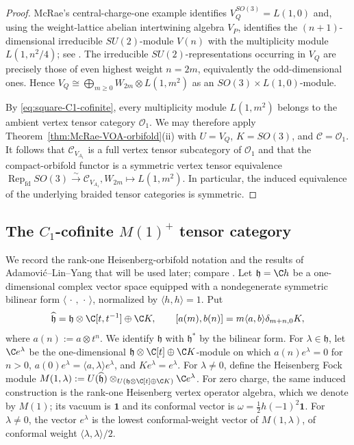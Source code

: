 \documentclass[12pt,leqno]{amsart}
\numberwithin{equation}{section} \newtheorem{thm}{Theorem}[section] \newtheorem{lem}[thm]{Lemma} \newtheorem{ex}[thm]{Example} \newtheorem{prop}[thm]{Proposition} \newtheorem{cor}[thm]{Corollary} \newtheorem{defi}[thm]{Definition} \newtheorem{rmk}[thm]{Remark} \newtheorem{notation}[thm]{Notation}
\newcommand{\one}{\mathbf{1}}
\newcommand{\Rep}{\operatorname{Rep}}
\newcommand{\Ovir}{\mathcal O_1}
\begin{document}
\begin{proof}
McRae's central-charge-one example identifies \(V_Q^{SO(3)}=L(1,0)\) and, using the weight-lattice abelian intertwining algebra \(V_P\), identifies the \((n+1)\)-dimensional irreducible \(SU(2)\)-module \(V(n)\) with the multiplicity module \(L(1,n^2/4)\); see \cite[Example~4.11]{McRae}. The irreducible \(SU(2)\)-representations occurring in \(V_Q\) are precisely those of even highest weight \(n=2m\), equivalently the odd-dimensional ones. Hence \(V_Q\cong\bigoplus_{m\ge0}W_{2m}\otimes L(1,m^2)\) as an \(SO(3)\times L(1,0)\)-module.

By \eqref{eq:square-C1-cofinite}, every multiplicity module \(L(1,m^2)\) belongs to the ambient vertex tensor category \(\Ovir\). We may therefore apply Theorem~\ref{thm:McRae-VOA-orbifold}(ii) with \(U=V_Q\), \(K=SO(3)\), and \(\mathcal C=\Ovir\). It follows that \(\mathcal C_{V_{A_1}}\) is a full vertex tensor subcategory of \(\Ovir\) and that the compact-orbifold functor is a symmetric vertex tensor equivalence \(\Rep_{\mathrm{fd}}SO(3) \overset{\sim}{\longrightarrow} \mathcal C_{V_{A_1}}, W_{2m}\longmapsto L(1,m^2)\). In particular, the induced equivalence of the underlying braided tensor categories is symmetric.
\end{proof}

\subsection{The \texorpdfstring{$C_1$}{C1}-cofinite \texorpdfstring{$M(1)^+$}{M(1)+} tensor category}
\label{subsec:ALY-package}

We record the rank-one Heisenberg-orbifold notation and the results of Adamovi\'c--Lin--Yang that will be used later; compare \cite[Section~2.1]{ALY}. Let $\mathfrak h=\C h$ be a one-dimensional complex vector space equipped with a nondegenerate symmetric bilinear form $\langle\,\cdot\,,\,\cdot\,\rangle$, normalized by $\langle h,h\rangle=1$. Put
\[
\widehat{\mathfrak h}
=
\mathfrak h\otimes\C[t,t^{-1}]\oplus\C K,
\qquad
[a(m),b(n)]
=
m\langle a,b\rangle\delta_{m+n,0}K,
\]
where $a(n):=a\otimes t^n$. We identify $\mathfrak h$ with $\mathfrak h^*$ by the bilinear form. For $\lambda\in\mathfrak h$, let $\C e^\lambda$ be the one-dimensional $\mathfrak h\otimes\C[t]\oplus\C K$-module on which \(a(n)e^\lambda=0\) for \(n>0\), \(a(0)e^\lambda=\langle a,\lambda\rangle e^\lambda\), and \(Ke^\lambda=e^\lambda\). For $\lambda\ne0$, define the Heisenberg Fock module \(M(1,\lambda):= U(\widehat{\mathfrak h}) \otimes_{U(\mathfrak h\otimes\C[t]\oplus\C K)} \C e^\lambda\). For zero charge, the same induced construction is the rank-one Heisenberg vertex operator algebra, which we denote by $M(1)$; its vacuum is $\one$ and its conformal vector is $\omega=\frac12h(-1)^2\one$. For $\lambda\ne0$, the vector $e^\lambda$ is the lowest conformal-weight vector of $M(1,\lambda)$, of conformal weight $\langle\lambda,\lambda\rangle/2$.
\end{document}
